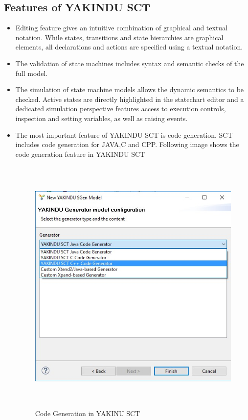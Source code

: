 \documentclass[a4paper,12pt,oneside]{article}
\begin{document}
\subsection{Features of YAKINDU SCT}
\begin{itemize}
\item Editing feature gives an intuitive combination of graphical and textual notation. While states, transitions and state hierarchies are graphical elements, all declarations and actions are specified using a textual notation.\\
\item The validation of state machines includes syntax and semantic checks of the full model.\\
\item The simulation of state machine models allows the dynamic semantics to be checked. Active states are directly highlighted in the statechart editor and a dedicated simulation perspective features access to execution controls, inspection and setting variables, as well as raising events.\\
\item The most important feature of YAKINDU SCT is code generation. SCT includes code generation for JAVA,C and CPP. Following image shows the code generation feature in YAKINDU SCT\\
\begin{figure}[H]
\centering
\includegraphics[width=14cm,height=13cm]{code.jpg}
\caption{Code Generation in YAKINU SCT}
\end{figure}
\end{itemize}
\newpage
\end{document}
